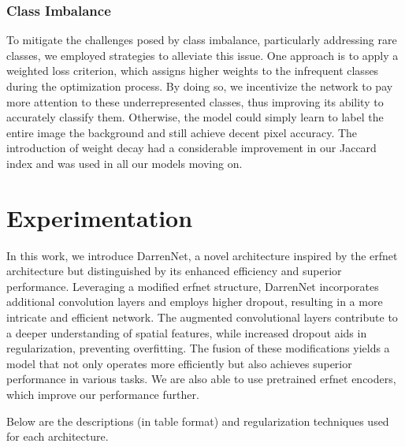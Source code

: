 \subsubsection*{Class Imbalance}
To mitigate the challenges posed by class imbalance, particularly addressing rare classes, we employed strategies to alleviate this issue. One approach is to apply a weighted loss criterion, which assigns higher weights to the infrequent classes during the optimization process. By doing so, we incentivize the network to pay more attention to these underrepresented classes, thus improving its ability to accurately classify them. Otherwise, the model could simply learn to label the entire image the background and still achieve decent pixel accuracy. The introduction of weight decay had a considerable improvement in our Jaccard index and was used in all our models moving on.

\section*{Experimentation}

In this work, we introduce DarrenNet, a novel architecture inspired by the erfnet architecture but distinguished by its enhanced efficiency and superior performance. Leveraging a modified erfnet structure, DarrenNet incorporates additional convolution layers and employs higher dropout, resulting in a more intricate and efficient network. The augmented convolutional layers contribute to a deeper understanding of spatial features, while increased dropout aids in regularization, preventing overfitting. The fusion of these modifications yields a model that not only operates more efficiently but also achieves superior performance in various tasks. We are also able to use pretrained erfnet encoders, which improve our performance further.

Below are the descriptions (in table format) and regularization techniques used for each architecture.

